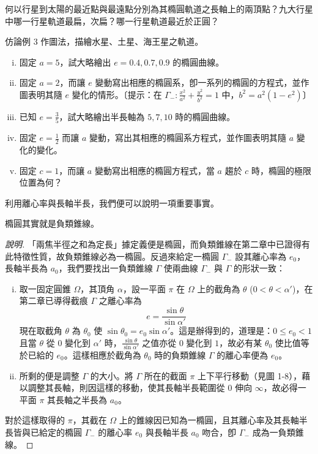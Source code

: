 \begin{exercise}
何以行星到太陽的最近點與最遠點分別為其橢圓軌道之長軸上的兩頂點？九大行星中哪一行星軌道最扁，次扁？哪一行星軌道最近於正圓？
\end{exercise}

\begin{exercise}
仿論例 3 作圖法，描繪水星、土星、海王星之軌道。
\end{exercise}

\begin{exercise}
\begin{enumerate}[(i)]
  \item 固定 $a=5$，試大略繪出 $e=0.4, 0.7, 0.9$ 的橢圓曲線。
  \item 固定 $a=2$，而讓 $e$ 變動寫出相應的橢圓系，卽一系列的橢圓的方程式，並作圖表明其隨 $e$ 變化的情形。〔提示：在 $\Gamma_- : \frac{x^2}{a^2} + \frac{y^2}{b^2} = 1$ 中，$b^2 = a^2(1-e^2)$〕
  \item 已知 $e = \frac{3}{5}$，試大略繪出半長軸為 $5, 7, 10$ 時的橢圓曲線。
  \item 固定 $e = \frac{1}{2}$ 而讓 $a$ 變動，寫出其相應的橢圓系方程式，並作圖表明其隨 $a$ 變化的變化。
  \item 固定 $c=1$，而讓 $a$ 變動寫出相應的橢圓方程式，當 $a$ 趨於 $c$ 時，橢圓的極限位置為何？
\end{enumerate}
\end{exercise}

利用離心率與長軸半長，我們便可以說明一項重要事實。

\begin{proposition}
橢圓其實就是負類錐線。
\end{proposition}

\begin{proof}[說明]
「兩焦半徑之和為定長」據定義便是橢圓，而負類錐線在第二章中已證得有此特徵性質，故負類錐線必為一橢圓。反過來給定一橢圓 $\Gamma_-$ 設其離心率為 $e_0$，長軸半長為 $a_0$，我們要找出一負類錐線 $\Gamma$ 使兩曲線 $\Gamma_-$ 與 $\Gamma$ 的形狀一致：
\begin{enumerate}[(i)]
  \item 取一固定圓錐 $\Omega$，其頂角 $\alpha$，設一平面 $\pi$ 在 $\Omega$ 上的截角為 $\theta$ ($0 < \theta < \alpha'$)，在第二章已導得截痕 $\Gamma$ 之離心率為
  \[ e = \frac{\sin\theta}{\sin\alpha'} \]
  現在取截角 $\theta$ 為 $\theta_0$ 使 $\sin\theta_0 = e_0 \sin\alpha'$。這是辦得到的，道理是：$0 \le e_0 < 1$ 且當 $\theta$ 從 $0$ 變化到 $\alpha'$ 時，$\frac{\sin\theta}{\sin\alpha'}$ 之值亦從 $0$ 變化到 $1$，故必有某 $\theta_0$ 使比值等於已給的 $e_0$。這樣相應於截角為 $\theta_0$ 時的負類錐線 $\Gamma$ 的離心率便為 $e_0$。
  \item 所剩的便是調整 $\Gamma$ 的大小。將 $\Gamma$ 所在的截面 $\pi$ 上下平行移動（見圖 1-8），藉以調整其長軸，則因這樣的移動，使其長軸半長範圍從 $0$ 伸向 $\infty$，故必得一平面 $\pi$ 其長軸之半長為 $a_0$。
\end{enumerate}
對於這樣取得的 $\pi$，其截在 $\Omega$ 上的錐線因已知為一橢圓，且其離心率及其長軸半長皆與已給定的橢圓 $\Gamma_-$ 的離心率 $e_0$ 與長軸半長 $a_0$ 吻合，卽 $\Gamma_-$ 成為一負類錐線。
\end{proof}

